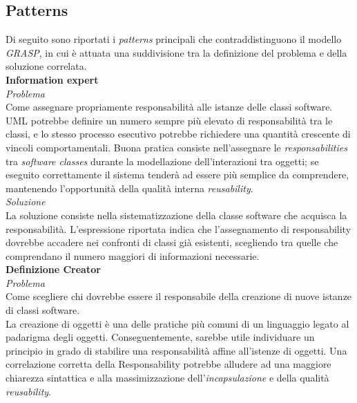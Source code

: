 \documentclass{article}
\begin{document}
\subsection*{Patterns}
\large
Di seguito sono riportati i \textit{patterns} principali che contraddistinguono il modello \textit{GRASP}, in cui è attuata una suddivisione tra la definizione del problema e della soluzione correlata.\vspace*{14pt}\\
\textbf{Information expert}\vspace*{7pt}\\
\textit{Problema}\\
Come assegnare propriamente responsabilità alle istanze delle classi software.\vspace*{7pt}\\
UML potrebbe definire un numero sempre più elevato di responsabilità tra le classi, e lo stesso processo esecutivo potrebbe richiedere una quantità crescente di vincoli comportamentali. Buona pratica consiste nell'assegnare le \textit{responsabilities} tra \textit{software classes} durante la modellazione dell'interazioni tra oggetti; se eseguito correttamente il sistema tenderà ad essere più semplice da comprendere, mantenendo l'opportunità della qualità interna \textit{reusability}.\vspace*{14pt}\\ 
\textit{Soluzione}\\
La soluzione consiste nella sistematizzazione della classe software che acquisca la responsabilità. L'espressione riportata indica che l'assegnamento di responsability dovrebbe accadere nei confronti di classi già esistenti, scegliendo tra quelle che comprendano il numero maggiori di informazioni necessarie.\vspace*{14pt}\\
\textbf{Definizione Creator}\vspace*{7pt}\\
\textit{Problema}\\
Come scegliere chi dovrebbe essere il responsabile della creazione di nuove istanze di classi software.\vspace*{7pt}\\
La creazione di oggetti è una delle pratiche più comuni di un linguaggio legato al padarigma degli oggetti. Conseguentemente, sarebbe utile individuare un principio in grado di stabilire una responsabilità affine all'istenze di oggetti. Una correlazione corretta della Responsability potrebbe alludere ad una maggiore chiarezza sintattica e alla massimizzazione dell'\textit{incapsulazione} e della qualità \textit{reusability}.\vspace*{14pt}\\
\end{document}
